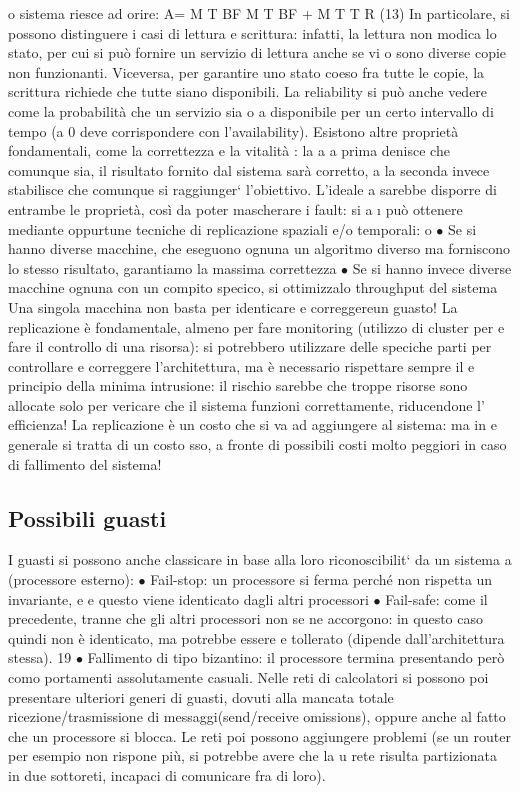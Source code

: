 \documentclass[a4paper,12pt]{article}
\begin{document}
o
sistema riesce ad orire:
A=
M T BF
M T BF + M T T R
(13)
In particolare, si possono distinguere i casi di lettura e scrittura: infatti, la lettura
non modica lo stato, per cui si può fornire un servizio di lettura anche se vi
o
sono diverse copie non funzionanti. Viceversa, per garantire uno stato coeso fra
tutte le copie, la scrittura richiede che tutte siano disponibili.
La reliability si può anche vedere come la probabilità che un servizio sia
o
a
disponibile per un certo intervallo di tempo (a 0 deve corrispondere con l'availability).
Esistono altre proprietà fondamentali, come la correttezza e la vitalità : la
a
a
prima denisce che comunque sia, il risultato fornito dal sistema sarà corretto,
a
la seconda invece stabilisce che comunque si raggiunger` l'obiettivo. L'ideale
a
sarebbe disporre di entrambe le proprietà, così da poter mascherare i fault: si
a
\i{}
può ottenere mediante oppurtune tecniche di replicazione spaziali e/o temporali:
o
$\bullet$ Se si hanno diverse macchine, che eseguono ognuna un algoritmo diverso
ma forniscono lo stesso risultato, garantiamo la massima correttezza
$\bullet$ Se si hanno invece diverse macchine ognuna con un compito specico, si
ottimizzalo throughput del sistema
Una singola macchina non basta per identicare e correggereun guasto! La
replicazione è fondamentale, almeno per fare monitoring (utilizzo di cluster per
e
fare il controllo di una risorsa): si potrebbero utilizzare delle speciche parti
per controllare e correggere l'architettura, ma è necessario rispettare sempre il
e
principio della minima intrusione: il rischio sarebbe che troppe risorse sono
allocate solo per vericare che il sistema funzioni correttamente, riducendone l'
efficienza! La replicazione è un costo che si va ad aggiungere al sistema: ma in
e
generale si tratta di un costo sso, a fronte di possibili costi molto peggiori in
caso di fallimento del sistema!
\subsection{Possibili guasti}
I guasti si possono anche classicare in base alla loro riconoscibilit` da un sistema
a
(processore esterno):
$\bullet$ Fail-stop: un processore si ferma perché non rispetta un invariante, e
e
questo viene identicato dagli altri processori
$\bullet$ Fail-safe: come il precedente, tranne che gli altri processori non se ne
accorgono: in questo caso quindi non è identicato, ma potrebbe essere
e
tollerato (dipende dall'architettura stessa).
19
$\bullet$ Fallimento di tipo bizantino: il processore termina presentando però como
portamenti assolutamente casuali.
Nelle reti di calcolatori si possono poi presentare ulteriori generi di guasti, dovuti
alla mancata totale ricezione/trasmissione di messaggi(send/receive omissions),
oppure anche al fatto che un processore si blocca. Le reti poi possono aggiungere
problemi (se un router per esempio non rispone più, si potrebbe avere che la
u
rete risulta partizionata in due sottoreti, incapaci di comunicare fra di loro).
\end{document}
